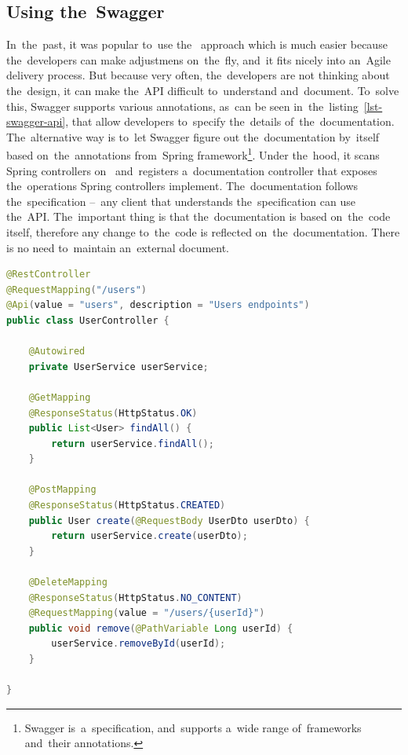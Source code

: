 \subsection{Using the~Swagger}
In~the~past, it was popular to~use the~ approach which is much
easier because the~developers can make adjustmens on~the~fly, and~it fits nicely
into an~Agile delivery process. But because very often, the~developers are not
thinking about the~design, it can make the~API difficult to~understand
and~document. To~solve this, Swagger supports various annotations, as~can be
seen in~the~listing~\ref{lst-swagger-api}, that allow developers to~specify
the~details of~the~documentation. The~alternative way is to~let Swagger figure
out the~documentation by~itself based on~the~annotations from~Spring
framework\footnote{Swagger is~a~specification, and~supports a~wide range
of~frameworks and~their annotations.}. Under the~hood, it scans Spring
controllers on~ and~registers a~documentation controller that
exposes the~operations Spring controllers implement. The~documentation follows
the~specification --~any client that understands the~specification can use
the~API. The~important thing is that the~documentation is based on~the~code
itself, therefore any change to~the~code is reflected on~the~documentation.
There is no need to~maintain an~external document.

\vspace{1mm}
\begin{lstlisting}[caption=An~example of~Spring controller with Swagger's
annotations that can be used to~generate API documentation., style=dp-default,
language=Java, label=lst-swagger-api]
@RestController
@RequestMapping("/users")
@Api(value = "users", description = "Users endpoints")
public class UserController {

	@Autowired
	private UserService userService;
	
	@GetMapping
	@ResponseStatus(HttpStatus.OK)
	public List<User> findAll() {
		return userService.findAll();
	}
	
	@PostMapping
	@ResponseStatus(HttpStatus.CREATED)
	public User create(@RequestBody UserDto userDto) {
		return userService.create(userDto);
	}
	
	@DeleteMapping
	@ResponseStatus(HttpStatus.NO_CONTENT)
	@RequestMapping(value = "/users/{userId}")
	public void remove(@PathVariable Long userId) {
		userService.removeById(userId);
	}

}
\end{lstlisting}

